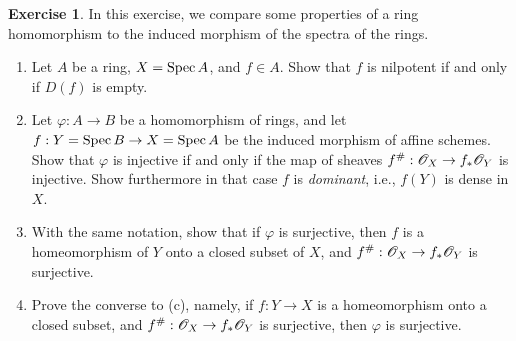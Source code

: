 \documentclass[]{pcmi}
\theoremstyle{plain}
\theoremstyle{definition}
\newtheorem{Exercise}[subsubsection]{Exercise}
\theoremstyle{remark}
\begin{document}
\begin{Exercise}
    In this exercise, we compare some properties of a ring homomorphism to the induced morphism of the spectra of the rings. 
    \begin{enumerate}[label = (\alph*)]
        \item  Let $A$ be a ring, $X = \operatorname{Spec} A$, and $f \in A$. Show that $f$ is nilpotent if and only if $D(f)$ is empty. 
        \item Let $\varphi : A \to B$ be a homomorphism of rings, and let $f : Y = \operatorname{Spec} B \to X = \operatorname{Spec} A$ be the induced morphism of affine schemes. Show that $\varphi$ is injective if and only if the map of sheaves $f^\# : \mathscr{O}_X \to f_* \mathscr{O}_Y$ is injective. Show furthermore in that case $f$ is \emph{dominant}, i.e., $f(Y)$ is dense in $X$. 
        \item With the same notation, show that if $\varphi$ is surjective, then $f$ is a homeomorphism of $Y$ onto a closed subset of $X$, and $f^{\#} : \mathscr{O}_X \to f_* \mathscr{O}_Y$ is surjective. 
        \item Prove the converse to (c), namely, if $f : Y \to X$ is a homeomorphism onto a closed subset, and $f^{\#} : \mathscr{O}_X \to f_* \mathscr{O}_Y$ is surjective, then $\varphi$ is surjective. 
    \end{enumerate}
\end{Exercise}
\end{document}
